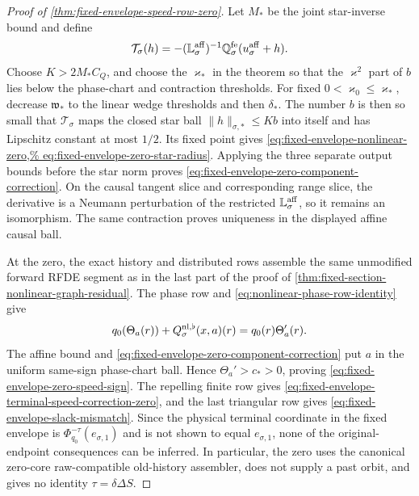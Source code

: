 \begin{proof}[Proof of
\cref{thm:fixed-envelope-speed-row-zero}]
Let \(M_*\) be the joint star-inverse bound and define
\[
\mathcal T_\sigma(h)
=-(\mathbb L_\sigma^{\rm aff})^{-1}
       \mathbb Q_\sigma^{\rm fe}(u_\sigma^{\rm aff}+h).
\]
Choose \(K>2M_*C_Q\), and choose the \(\varkappa_*\) in the theorem so
that the \(\varkappa^2\) part of \(b\) lies below the phase-chart and
contraction thresholds.  For fixed
\(0<\varkappa_0\le\varkappa_*\), decrease \(\mathfrak w_*\) to the linear
wedge thresholds and then \(\delta_*\).  The number \(b\) is then so small
that
\(\mathcal T_\sigma\) maps the closed star ball
\(\|h\|_{\sigma,*}\le Kb\) into itself and has Lipschitz constant at
most \(1/2\).  Its fixed point gives
\cref{eq:fixed-envelope-nonlinear-zero,%
eq:fixed-envelope-zero-star-radius}.  Applying the three separate output
bounds before the star norm proves
\cref{eq:fixed-envelope-zero-component-correction}.  On the causal
tangent slice and corresponding range slice, the derivative is a Neumann
perturbation of the restricted \(\mathbb L_\sigma^{\rm aff}\), so it remains
an isomorphism.  The same contraction proves uniqueness in the displayed
affine causal ball.

At the zero, the exact history and distributed rows assemble the same
unmodified forward RFDE segment as in the last part of the proof of
\cref{thm:fixed-section-nonlinear-graph-residual}.  The phase row and
\cref{eq:nonlinear-phase-row-identity} give
\[
 q_0(\Theta_a(r))+Q_\sigma^{\rm nl,\flat}(x,a)(r)
 =q_0(r)\Theta_a'(r).
\]
The affine bound and
\cref{eq:fixed-envelope-zero-component-correction} put \(a\) in the
uniform same-sign phase-chart ball.  Hence \(\Theta_a'>c_*>0\), proving
\cref{eq:fixed-envelope-zero-speed-sign}.  The repelling finite row gives
\cref{eq:fixed-envelope-terminal-speed-correction-zero}, and the last
triangular row gives \cref{eq:fixed-envelope-slack-mismatch}.  Since the
physical terminal coordinate in the fixed envelope is
\(\Phi_{q_0}^{-\tau}(e_{\sigma,1})\) and is not shown to equal
\(e_{\sigma,1}\), none of the original-endpoint consequences can be
inferred.  In particular, the zero uses the canonical
zero-core raw-compatible old-history assembler, does not supply a past
orbit, and gives no identity \(\tau=\delta\Delta S\).
\end{proof}

